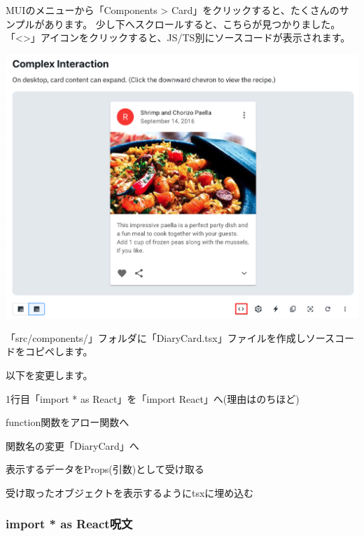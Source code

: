 MUIのメニューから「Components \textgreater{} Card」をクリックすると、たくさんのサンプルがあります。
少し下へスクロールすると、こちらが見つかりました。
「\textless{}\textgreater{}」アイコンをクリックすると、JS/TS別にソースコードが表示されます。

\begin{reviewimage}%
\includegraphics[width=1.0\maxwidth]{./images/03-todo-with-react/mui009-card-ComplexInteraction.png}%
\label{image:03-todo-with-react:mui009-card-ComplexInteraction}
\end{reviewimage}

「src/components/」フォルダに「DiaryCard.tsx」ファイルを作成しソースコードをコピペします。

以下を変更します。

\begin{starteritemize}
\item 1行目「import * as React」を「import React」へ(理由はのちほど)
\item function関数をアロー関数へ
\item 関数名の変更「DiaryCard」へ
\item 表示するデータをProps(引数)として受け取る
\item 受け取ったオブジェクトを表示するようにtsxに埋め込む
\end{starteritemize}

\subsubsection*{import * as React呪文}
\keeplastskip{
  \label{sec:3-3-4-1}
  \label{sec-00332-1}
  \par\nobreak
}

